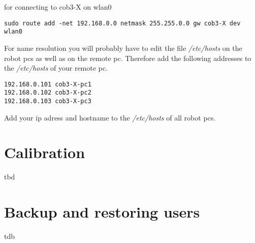 for connecting to cob3-X on wlan0
\begin{lstlisting}
sudo route add -net 192.168.0.0 netmask 255.255.0.0 gw cob3-X dev wlan0
\end{lstlisting}


For name resolution you will probably have to edit the file \textit{/etc/hosts} on the robot pcs as well as on the remote pc. Therefore add the following addresses to the \textit{/etc/hosts} of your remote pc.
\begin{lstlisting}
192.168.0.101 cob3-X-pc1
192.168.0.102 cob3-X-pc2
192.168.0.103 cob3-X-pc3
\end{lstlisting}

Add your ip adress and hostname to the \textit{/etc/hosts} of all robot pcs.

\section{Calibration}
tbd
\section{Backup and restoring users}   
tdb


